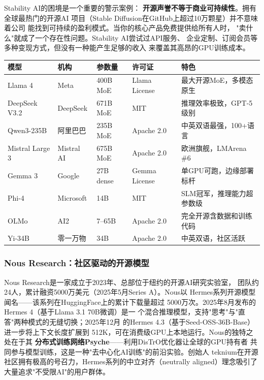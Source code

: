 Stability AI的困境是一个重要的警示案例：
\textbf{开源声誉不等于商业可持续性}。拥有全球最热门的开源AI
项目（Stable Diffusion在GitHub上超过10万颗星）并不意味着公司
能找到可持续的盈利模式。当你的核心产品免费提供给所有人时，
"卖什么"就成了一个存在性问题。Stability AI尝试过API服务、
企业定制、订阅会员等多种变现方式，但没有一种能产生足够的收入
来覆盖其高昂的GPU训练成本。

\begin{keybox}
\small
\begin{tabularx}{\textwidth}{l l l l X}
\toprule
\rowcolor{figLightGray}
\textbf{模型} & \textbf{机构} & \textbf{参数量} & \textbf{许可证} & \textbf{特色} \\
\midrule
Llama 4        & Meta        & 400B MoE  & Llama License  & 最大开源MoE，多模态原生 \\
DeepSeek V3.2  & DeepSeek    & 671B MoE  & MIT            & 推理效率极致，GPT-5级别 \\
Qwen3-235B     & 阿里巴巴    & 235B MoE  & Apache 2.0     & 中英双语最强，100+语言 \\
Mistral Large 3& Mistral AI  & 675B MoE  & Apache 2.0     & 欧洲旗舰，LMArena \#6 \\
Gemma 3        & Google      & 27B dense & Gemma License  & 单GPU可跑，边缘部署标杆 \\
Phi-4          & Microsoft   & 14B       & MIT            & SLM冠军，推理能力超参数级 \\
OLMo           & AI2         & 7--65B    & Apache 2.0     & 完全开源含数据和训练代码 \\
Yi-34B         & 零一万物    & 34B       & Apache 2.0     & 中英双语，社区活跃 \\
\bottomrule
\end{tabularx}
\end{keybox}

\subsubsection{Nous Research：社区驱动的开源模型}
Nous Research是一家成立于2023年、总部位于纽约的开源AI研究实验室，
团队约24人，累计融资5000万美元（2025年5月Series A）。Nous以
Hermes系列开源模型闻名——该系列在HuggingFace上的累计下载量超过
5000万次。2025年8月发布的Hermes 4（基于Llama 3.1 70B微调）是一
个混合推理模型，支持"思考"与"直答"两种模式的无缝切换；2025年12月
的Hermes 4.3（基于Seed-OSS-36B-Base）进一步将上下文长度扩展到
512K，可在消费级GPU上本地运行。Nous的独特之处在于其
\textbf{分布式训练网络Psyche}——利用DisTrO优化器让全球的GPU持有者
共同参与模型训练，这是一种"去中心化AI训练"的前沿实验。创始人
teknium在开源社区拥有极高的号召力，Hermes系列的中立对齐（neutrally
aligned）理念吸引了大量追求"不受限AI"的用户群体。

